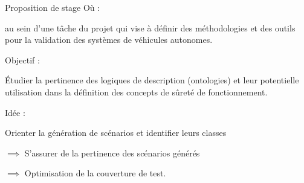 \documentclass[
  hyperref={
    pdfusetitle,
    pdfencoding=auto,
    psdextra,
    colorlinks=true,
    linkcolor=darkblue,
    citecolor=darkred,
    urlcolor=darkblue,
  },
  9pt,
  aspectratio=169,
]{beamer}
\begin{document}
\begin{frame}{Proposition de stage}
  Où :

  au sein d'une tâche du projet 
  qui vise à définir des méthodologies et des outils
  pour la validation des systèmes de véhicules autonomes.

  \medskip

  Objectif :

  Étudier la pertinence des logiques de description
  (ontologies)
  et leur potentielle utilisation dans la définition des concepts
  de sûreté de fonctionnement.

  \medskip

  Idée :

  Orienter la génération de scénarios
  et identifier leurs classes

  \(\implies\) S'assurer de la pertinence des scénarios générés

  \(\implies\) Optimisation de la couverture de test.
\end{frame}

\end{document}
